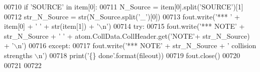 \begin{DoxyCode}
00710         \textcolor{keywordflow}{if} \textcolor{stringliteral}{'SOURCE'} \textcolor{keywordflow}{in} item[0]:
00711             N\_Source = item[0].split(\textcolor{stringliteral}{'SOURCE'})[1]
00712             str\_N\_Source = str(N\_Source.split(\textcolor{stringliteral}{'\_'})[0])
00713             fout.write(\textcolor{stringliteral}{'*** '} + item[0] + \textcolor{stringliteral}{' '} + str(item[1]) + \textcolor{stringliteral}{'\(\backslash\)n'})
00714             \textcolor{keywordflow}{try}:
00715                 fout.write(\textcolor{stringliteral}{'*** NOTE'} + str\_N\_Source + \textcolor{stringliteral}{' '} + atom.CollData.CollHeader.get(\textcolor{stringliteral}{'NOTE'}+
      str\_N\_Source)  + \textcolor{stringliteral}{'\(\backslash\)n'})
00716             \textcolor{keywordflow}{except}:
00717                 fout.write(\textcolor{stringliteral}{'*** NOTE'} + str\_N\_Source + \textcolor{stringliteral}{' collision strengths \(\backslash\)n'})
00718     print(\textcolor{stringliteral}{'\{\} done'}.format(fileout))
00719     fout.close()
00720     
00721     
00722     
\end{DoxyCode}
